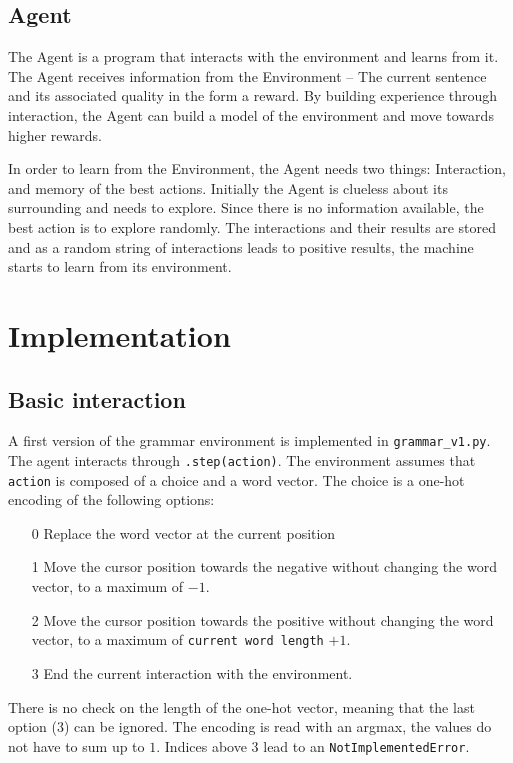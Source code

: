 \documentclass[a4paper, justified]{tufte-handout}
\begin{document}
\subsection{Agent}

The Agent is a program that interacts with the environment and learns from it. The Agent receives information from the Environment – The current sentence and its associated quality in the form a reward. By building experience through interaction, the Agent can build a model of the environment and move towards higher rewards.

In order to learn from the Environment, the Agent needs two things: Interaction, and memory of the best actions. Initially the Agent is clueless about its surrounding and needs to explore. Since there is no information available, the best action is to explore randomly. The interactions and their results are stored and as a random string of interactions leads to positive results, the machine starts to learn from its environment.\cite{thomas2018}

\section{Implementation}

\subsection{Basic interaction}

A first version of the grammar environment is implemented in \texttt{grammar\_v1.py}. The agent interacts through \texttt{.step(action)}. The environment assumes that \texttt{action} is composed of a choice and a word vector. The choice is a one-hot encoding of the following options:
\begin{itemize}
\item[0]{Replace the word vector at the current position}
\item[1]{Move the cursor position towards the negative without changing the word vector, to a maximum of $-1$.}
\item[2]{Move the cursor position towards the positive without changing the word vector, to a maximum of \texttt{current word length} $+1$.}
\item[3]{End the current interaction with the environment.}
\end{itemize}
There is no check on the length of the one-hot vector, meaning that the last option (3) can be ignored. The encoding is read with an argmax, the values do not have to sum up to $1$. Indices above 3 lead to an \texttt{NotImplementedError}.







\end{document}

